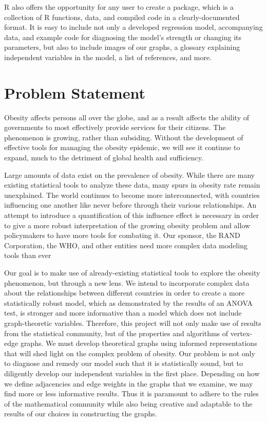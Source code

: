 \documentclass[oneside,12pt]{report}
\begin{document}
R also offers the opportunity for any user to create a package, which is a collection of R functions, data, and compiled code in a clearly-documented format. It is easy to include not only a developed regression model, accompanying data, and example code for diagnosing the model's strength or changing its parameters, but also to include images of our graphs, a glossary explaining independent variables in the model, a list of references, and more.

\chapter{Problem Statement}

Obesity affects persons all over the globe, and as a result affects the ability of governments to most effectively provide services for their citizens. The phenomenon is growing, rather than subsiding. Without the development of effective tools for managing the obesity epidemic, we will see it continue to expand, much to the detriment of global health and sufficiency.

Large amounts of data exist on the prevalence of obesity. While there are many existing statistical tools to analyze these data, many spurs in obesity rate remain unexplained. The world continues to become more interconnected, with countries influencing one another like never before through their various relationships. An attempt to introduce a quantification of this influence effect is necessary in order to give a more robust interpretation of the growing obesity problem and allow policymakers to have more tools for combating it. Our sponsor, the RAND Corporation, the WHO, and other entities need more complex data modeling tools than ever

Our goal is to make use of already-existing statistical tools to explore the obesity phenomenon, but through a new lens. We intend to incorporate complex data about the relationships between different countries in order to create a more statistically robust model, which as demonstrated by the results of an ANOVA test, is stronger and more informative than a model which does not include graph-theoretic variables. Therefore, this project will not only make use of results from the statistical community, but of the properties and algorithms of vertex-edge graphs. We must develop theoretical graphs using informed representations that will shed light on the complex problem of obesity. Our problem is not only to diagnose and remedy our model such that it is statistically sound, but to diligently develop our independent variables in the first place. Depending on how we define adjacencies and edge weights in the graphs that we examine, we may find more or less informative results. Thus it is paramount to adhere to the rules of the mathematical community while also being creative and adaptable to the results of our choices in constructing the graphs.
\end{document}
